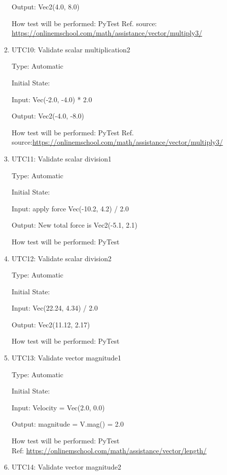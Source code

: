 \documentclass[12pt, titlepage]{article}
\begin{document}
\begin{enumerate}
	Output: Vec2(4.0, 8.0)
	
	How test will be performed: PyTest
	Ref. source: \url{https://onlinemschool.com/math/assistance/vector/multiply3/}
	
	\item{UTC10}{: Validate scalar multiplication2\\}
	
	Type: Automatic
	
	Initial State: 
	
	Input:  Vec(-2.0, -4.0) * 2.0
	
	Output:  Vec2(-4.0, -8.0)
	
	How test will be performed: PyTest
	Ref. source:\url{https://onlinemschool.com/math/assistance/vector/multiply3/}
	
	\item{UTC11}{: Validate scalar division1\\}
	
	Type: Automatic
	
	Initial State: 
	
	Input: apply force Vec(-10.2, 4.2) / 2.0
	
	Output: New total force is Vec2(-5.1, 2.1)
	
	How test will be performed: PyTest
	
	\item{UTC12}{: Validate scalar division2\\}
	
	Type: Automatic
	
	Initial State: 
	
	Input: Vec(22.24, 4.34) / 2.0
	
	Output: Vec2(11.12, 2.17)
	
	How test will be performed: PyTest
	
	\item{UTC13}{: Validate vector magnitude1\\}
	
	Type: Automatic
	
	Initial State: 
	
	Input: Velocity = Vec(2.0, 0.0)
	
	Output: magnitude = V.mag() = 2.0
	
	How test will be performed: PyTest\\
	Ref: \url{https://onlinemschool.com/math/assistance/vector/length/}
	
	\item{UTC14}{: Validate vector magnitude2\\}
	

\end{enumerate}
\end{document}
